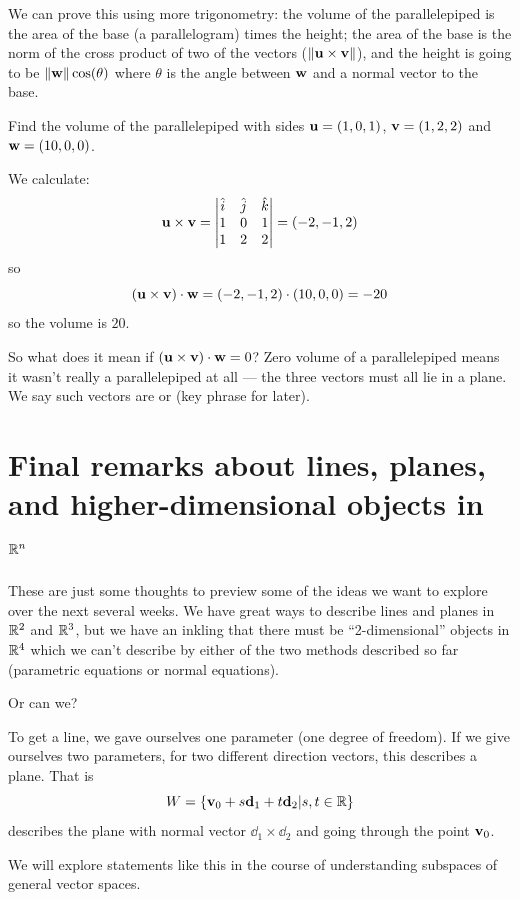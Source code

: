 We can prove this using more trigonometry:  the volume of
the parallelepiped is the area of the base (a parallelogram)
times the height; the area of the base is the norm of the cross product
of two of the vectors ($\Vert \mathbf{u} \times \mathbf{v} \Vert$), and the height is going to be 
$\Vert \mathbf{w} \Vert \cos(\theta)$ where $\theta$ is the angle between
$\mathbf{w}$ and a normal vector to the base.

\begin{myprob}
Find the volume of the parallelepiped with sides $\mathbf{u} = (1,0,1)$,
$\mathbf{v} = (1,2,2)$ and $\mathbf{w} = (10,0,0)$.

\begin{mysol}
We calculate:
$$
\mathbf{u} \times \mathbf{v} =  \left| \begin{matrix}
\hat{i} & \hat{j} & \hat{k} \\
1 & 0 & 1\\
1 & 2 & 2 \end{matrix} \right| 
= (-2,-1,2)
$$
so
$$
(\mathbf{u} \times \mathbf{v})\cdot \mathbf{w} = (-2,-1,2)\cdot (10,0,0) = -20
$$
so the volume is $20$.
\end{mysol}\end{myprob}

So what does it mean if $(\mathbf{u} \times \mathbf{v})\cdot \mathbf{w} = 0$?  Zero
volume of a parallelepiped means it wasn't really a parallelepiped
at all --- the three vectors must all lie in a plane.  We
say such vectors are  or 
(key phrase for later).





\section{Final remarks about lines, planes, and higher-dimensional
objects in \texorpdfstring{$\mathbb{R}^n$}{Rn}}  

These are just some thoughts to preview some of the ideas
we want to explore over the next several weeks.  We have
great ways to describe lines and planes in $\mathbb{R}^2$ and $\mathbb{R}^3$,
but we have an inkling that there must be ``2-dimensional'' objects
in $\mathbb{R}^4$ which we can't describe by either of the two
methods described so far (parametric equations or normal equations).

Or can we?  

To get a line,
we gave ourselves one parameter (one degree of freedom).  If
we give ourselves two parameters, for two different direction
vectors, this describes a plane.  That is
$$
W = \{ \mathbf{v}_0 + s\mathbf{d}_1 + t\mathbf{d}_2 | s,t\in\mathbb{R}\}
$$
describes the plane with normal vector $\dd_1 \times \dd_2$
and going through the point $\mathbf{v}_0$.

We will explore statements like this in the course of understanding
subspaces of general vector spaces.



